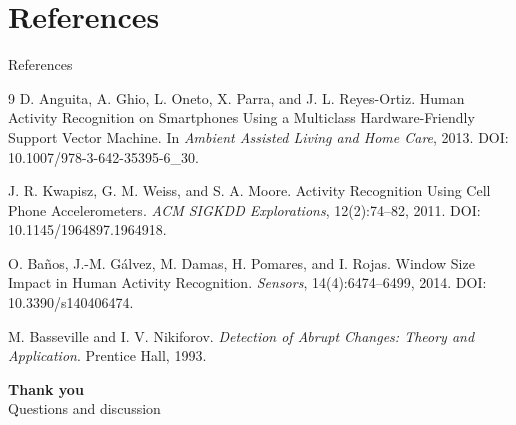 \documentclass[aspectratio=169,10pt]{beamer}
\begin{document}
\section{References}
\begin{frame}[allowframebreaks]{References}
  \footnotesize
  \begin{thebibliography}{9}
    D. Anguita, A. Ghio, L. Oneto, X. Parra, and J. L. Reyes-Ortiz.
    \newblock Human Activity Recognition on Smartphones Using a Multiclass Hardware-Friendly Support Vector Machine.
    \newblock In \emph{Ambient Assisted Living and Home Care}, 2013. DOI: 10.1007/978-3-642-35395-6\_30.

    J. R. Kwapisz, G. M. Weiss, and S. A. Moore.
    \newblock Activity Recognition Using Cell Phone Accelerometers.
    \newblock \emph{ACM SIGKDD Explorations}, 12(2):74--82, 2011. DOI: 10.1145/1964897.1964918.

    O. Ba\~nos, J.-M. G\'alvez, M. Damas, H. Pomares, and I. Rojas.
    \newblock Window Size Impact in Human Activity Recognition.
    \newblock \emph{Sensors}, 14(4):6474--6499, 2014. DOI: 10.3390/s140406474.

    M. Basseville and I. V. Nikiforov.
    \newblock \emph{Detection of Abrupt Changes: Theory and Application}.
    \newblock Prentice Hall, 1993.

  \end{thebibliography}
\end{frame}

\begin{frame}[plain]
  \vspace{1.4cm}
  \begin{center}
    {\Huge\bfseries\color{ink}Thank you}\\[.35cm]
    {\Large\color{muted}Questions and discussion}\\[.8cm]
  \end{center}
\end{frame}
\end{document}
